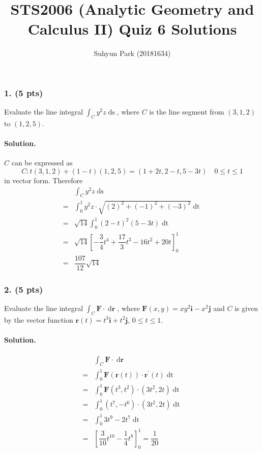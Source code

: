 \documentclass[runningheads]{llncs}
\begin{document}
\title{STS2006 (Analytic Geometry and Calculus II) \newline Quiz 6 Solutions}
\author{Suhyun Park (20181634)}
\maketitle

\subsubsection{1. (5 pts)} Evaluate the line integral $\int_C y^2z \mathop{ds}$, where $C$ is the line segment from $\left(3, 1, 2\right)$ to $\left(1, 2, 5\right)$.

\paragraph{Solution.} $C$ can be expressed as
\[C: t\left(3, 1, 2\right) + \left(1-t\right)\left(1, 2, 5\right)=\left(1+2t, 2-t, 5-3t\right) \quad 0\leq t\leq1\]
in vector form. Therefore
\begin{align*}
	& \int_C y^2z \mathop{ds}\\
	=& \int_0^1 y^2z\cdot\sqrt{\left(2\right)^2+\left(-1\right)^2+\left(-3\right)^2}\mathop{dt}\\
	=& \sqrt{14}\int_0^1 \left(2-t\right)^2\left(5-3t\right)\mathop{dt}\\
	=& \sqrt{14}\left[-\dfrac{3}{4}t^4+\dfrac{17}{3}t^3-16t^2+20t\right]_0^1\\
	=& \dfrac{107}{12}\sqrt{14}
\end{align*}
\par

\subsubsection{2. (5 pts)} Evaluate the line integral $\int_C \mathbf{F}\cdot\mathop{d\mathbf{r}}$, where $\mathbf{F}\left(x, y\right)=xy^2\mathbf{i}-x^2\mathbf{j}$ and $C$ is given by the vector function $\mathbf{r}\left(t\right)=t^3\mathbf{i}+t^2\mathbf{j}$, $0\leq t\leq1$.

\paragraph{Solution.}

\begin{align*}
	& \int_C \mathbf{F}\cdot\mathop{d\mathbf{r}}\\
	=& \int_0^1 \mathbf{F}\left(\mathbf{r}\left(t\right)\right)\cdot\mathbf{r}^\prime\left(t\right)\mathop{dt}\\
	=& \int_0^1 \mathbf{F}\left(t^3, t^2\right)\cdot\left(3t^2, 2t\right)\mathop{dt}\\
	=& \int_0^1 \left(t^7, -t^6\right)\cdot\left(3t^2, 2t\right)\mathop{dt}\\
	=& \int_0^1 3t^9-2t^7\mathop{dt}\\
	=& \left[\dfrac{3}{10}t^{10}-\dfrac{1}{4}t^8\right]_0^1 = \dfrac{1}{20}
\end{align*}
\end{document}
